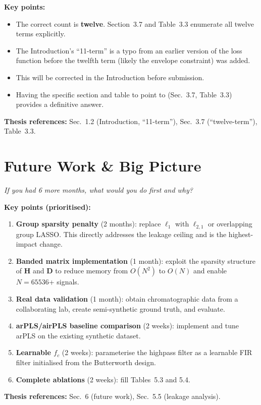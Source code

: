 \documentclass[11pt, letterpaper]{article}
\newcounter{qcounter}
\newcommand{\question}[1]{%
  \stepcounter{qcounter}%
  \begin{questionbox}[Q\theqcounter]%
    \itshape #1%
  \end{questionbox}%
}
\begin{document}
\begin{answerbox}
\textbf{Key points:}
\begin{itemize}[nosep]
  \item The correct count is \textbf{twelve}.  Section~3.7 and
        Table~3.3 enumerate all twelve terms explicitly.
  \item The Introduction's ``11-term'' is a typo from an earlier
        version of the loss function before the twelfth term
        (likely the envelope constraint) was added.
  \item This will be corrected in the Introduction before
        submission.
  \item Having the specific section and table to point to
        (Sec.~3.7, Table~3.3) provides a definitive answer.
\end{itemize}
\textbf{Thesis references:} Sec.~1.2 (Introduction, ``11-term''), Sec.~3.7 (``twelve-term''), Table~3.3.
\end{answerbox}


\section{Future Work \& Big Picture}

\question{If you had 6 more months, what would you do first and why?}

\begin{answerbox}
\textbf{Key points (prioritised):}
\begin{enumerate}[nosep]
  \item \textbf{Group sparsity penalty} (2 months): replace $\ell_1$
        with $\ell_{2,1}$ or overlapping group LASSO.  This directly
        addresses the leakage ceiling and is the highest-impact change.
  \item \textbf{Banded matrix implementation} (1 month): exploit the
        sparsity structure of $\mathbf{H}$ and $\mathbf{D}$ to reduce
        memory from $O(N^2)$ to $O(N)$ and enable $N{=}65536$+ signals.
  \item \textbf{Real data validation} (1 month): obtain chromatographic
        data from a collaborating lab, create semi-synthetic ground
        truth, and evaluate.
  \item \textbf{arPLS/airPLS baseline comparison} (2 weeks): implement
        and tune arPLS on the existing synthetic dataset.
  \item \textbf{Learnable $f_c$} (2 weeks): parameterise the highpass
        filter as a learnable FIR filter initialised from the
        Butterworth design.
  \item \textbf{Complete ablations} (2 weeks): fill Tables~5.3 and
        5.4.
\end{enumerate}
\textbf{Thesis references:} Sec.~6 (future work), Sec.~5.5 (leakage analysis).
\end{answerbox}
\end{document}
